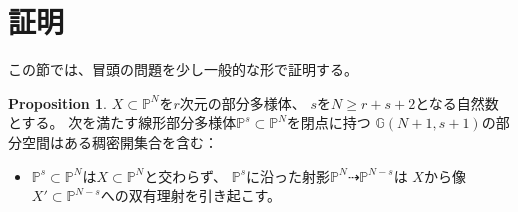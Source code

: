 \documentclass[uplatex]{jsarticle}
\theoremstyle{definition}
\newtheorem{prop}[prop]{Proposition}
\newcommand{\G}{\mathbb{G}}
\renewcommand{\P}{\mathbb{P}}
\newcommand{\dto}{\dashrightarrow}
\begin{document}
\section{証明}



この節では、冒頭の問題\cite[演習 I.4.9]{Ha}を少し一般的な形で証明する。

\begin{prop}
  \(X\subset \P^N\)を\(r\)次元の部分多様体、
  \(s\)を\(N\geq r+s+2\)となる自然数とする。
  次を満たす線形部分多様体\(\P^s\subset \P^N\)を閉点に持つ
  \(\G(N+1,s+1)\)の部分空間はある稠密開集合を含む：
  \begin{itemize}
    \item
    \(\P^s\subset \P^N\)は\(X\subset \P^N\)と交わらず、
    \(\P^s\)に沿った射影\(\P^N\dto \P^{N-s}\)は
    \(X\)から像\(X'\subset \P^{N-s}\)への双有理射を引き起こす。
  \end{itemize}
\end{prop}
\end{document}
